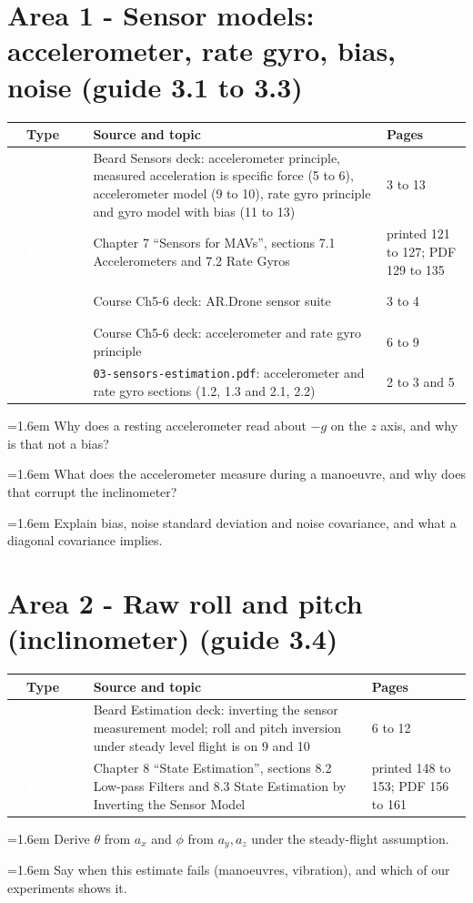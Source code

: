 \documentclass[10pt,a4paper]{article}
\newcommand{\cb}{\raisebox{-0.35ex}{\Large$\square$}}
\newcommand{\cbx}{\raisebox{-0.35ex}{\Large$\boxtimes$}}
\newcommand{\srctag}[2]{\colorbox{#1}{\textcolor{white}{\textbf{\scriptsize\,#2\,}}}}
\newcommand{\SLIDES}{\srctag{slides}{SLIDES}}
\newcommand{\BOOK}{\srctag{book}{BOOK}}
\newcommand{\NOTES}{\srctag{notes}{NOTES}}
\newcommand{\chk}[1]{\par\noindent\hangindent=1.6em\hangafter=1 \cb\hspace{0.6em}#1}
\begin{document}
\section*{Area 1 - Sensor models: accelerometer, rate gyro, bias, noise \hfill\normalfont\small (guide 3.1 to 3.3)}

\begin{tabularx}{\textwidth}{@{}C T X l@{}}
\toprule
\cb & Type & Source and topic & Pages\\
\midrule
\cbx & \SLIDES & Beard Sensors deck: accelerometer principle, measured acceleration is specific force (5 to 6), accelerometer model (9 to 10), rate gyro principle and gyro model with bias (11 to 13) & 3 to 13\\
\cbx & \BOOK & Chapter 7 ``Sensors for MAVs'', sections 7.1 Accelerometers and 7.2 Rate Gyros & printed 121 to 127; PDF 129 to 135\\
\cbx & \SLIDES & Course Ch5-6 deck: AR.Drone sensor suite & 3 to 4\\
\cbx & \SLIDES & Course Ch5-6 deck: accelerometer and rate gyro principle & 6 to 9\\
\cb & \NOTES & \texttt{03-sensors-estimation.pdf}: accelerometer and rate gyro sections (1.2, 1.3 and 2.1, 2.2) & 2 to 3 and 5\\
\bottomrule
\end{tabularx}
\begin{selfcheck}
\chk{Why does a resting accelerometer read about $-g$ on the $z$ axis, and why is that not a bias?}
\chk{What does the accelerometer measure during a manoeuvre, and why does that corrupt the inclinometer?}
\chk{Explain bias, noise standard deviation and noise covariance, and what a diagonal covariance implies.}
\end{selfcheck}

\section*{Area 2 - Raw roll and pitch (inclinometer) \hfill\normalfont\small (guide 3.4)}

\begin{tabularx}{\textwidth}{@{}C T X l@{}}
\toprule
\cb & Type & Source and topic & Pages\\
\midrule
\cbx & \SLIDES & Beard Estimation deck: inverting the sensor measurement model; roll and pitch inversion under steady level flight is on 9 and 10 & 6 to 12\\
\cbx & \BOOK & Chapter 8 ``State Estimation'', sections 8.2 Low-pass Filters and 8.3 State Estimation by Inverting the Sensor Model & printed 148 to 153; PDF 156 to 161\\
\bottomrule
\end{tabularx}
\begin{selfcheck}
\chk{Derive $\theta$ from $a_x$ and $\phi$ from $a_y,a_z$ under the steady-flight assumption.}
\chk{Say when this estimate fails (manoeuvres, vibration), and which of our experiments shows it.}
\end{selfcheck}
\end{document}
